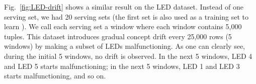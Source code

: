 {Fig.~\ref{fig:LED-drift} shows a similar result on the LED dataset. Instead
of one serving set, we had 20 serving sets (the first set is also used as a training
set to learn \dis). We call each serving set a window where each window
contains 5,000 tuples. This dataset introduces gradual concept drift every
25,000 rows (5 windows) by making a subset of LEDs malfunctioning. As one can
clearly see, during the initial 5 windows, no drift is observed. In the next 5
windows, LED 4 and LED 5 starts malfunctioning; in the next 5 windows, LED 1
and LED 3 starts malfunctioning, and so on.
}